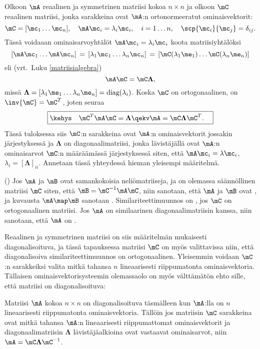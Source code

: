 Olkoon $\mA$ reaalinen ja symmetrinen matriisi kokoa $n\times n$ ja olkoon $\mC$ reaalinen
matriisi, jonka sarakkeina ovat $\mA$:n ortonormeeratut ominaisvektorit:
\[
\mC=[\mc_1\ldots\mc_n],\quad 
         \mA\mc_i=\lambda_i\mc_i, \quad i=1\ldots n, \quad \scp{\mc_i}{\mc_j}=\delta_{ij}.
\]
Tässä voidaaan ominaisarvoyhtälöt $\mA\mc_i=\lambda_i\mc_i$ koota matriisiyhtälöksi
\[
[\mA\mc_1\ldots\mA\mc_n] \,=\, [\lambda_1\mc_1\ldots\lambda_n\mc_n]
                         \,=\, [\mC(\lambda_1\me_1)\ldots\mC(\lambda_n\me_n)]
\]
eli (vrt.\ Luku \ref{matriisialgebra})
\[
\mA\mC=\mC\boldsymbol{\Lambda},
\]
missä $\boldsymbol{\Lambda}=[\lambda_1\me_1\ldots\lambda_n\me_n]=\text{diag}(\lambda_i)$. Koska
$\mC$ on ortogonaalinen, on $\inv{\mC}=\mC^T$, joten seuraa
\[
\boxed{\kehys\quad \mC^T\mA\mC=\boldsymbol{\Lambda}
                          \qekv \mA=\mC\boldsymbol{\Lambda}\mC^T. \quad}
\]
Tässä tuloksessa siis $\mC$:n sarakkeina ovat $\mA$:n  ominaisvektorit 
jossakin järjestyksessä ja $\boldsymbol{\Lambda}$ on diagonaalimatriisi, jonka lävistäjällä ovat
$\mA$:n ominaisarvot $\mC$:n määräämässä järjestyksessä siten, että $\mA\mc_i=\lambda\mc_i$,
$\lambda_i=[\boldsymbol{\Lambda}]_{ii}$. Annetaan tässä yhteydessä hieman yleisempi määritelmä.
\begin{Def} () \label{similaarimuunnos}
 
Jos $\mA$ ja $\mB$ ovat 
samankokoisia neliömatriiseja, ja on olemassa säännöllinen matriisi $\mC$ siten, että 
$\mB=\mC^{-1}\mA\mC$, niin sanotaan, että $\mA$ ja $\mB$ ovat , ja kuvausta
$\mA \map \mB$ sanotaan . Similariteettimuunnos on 
, jos $\mC$ on ortogonaalinen matriisi. Jos $\mA$ on similaarinen 
diagonaalimatriisin kanssa, niin sanotaan, että $\mA$ on .
\end{Def}
Reaalinen ja symmetrinen matriisi on siis määritelmän mukaisesti diagonalisoituva, ja tässä
tapauksessa matriisi $\mC$ on myös valittavissa niin, että diagonalisoiva similariteettimuunnos
on ortogonaalinen. Yleisemmin voidaan $\mC$:n sarakkeiksi valita mitkä tahansa $n$ lineaarisesti
riippumatonta ominaisvektoria. Tällaisen ominaisvektorisysteemin olemassaolo on myös
välttämätön ehto sille, että matriisi on diagonalisoituva:
\begin{Lause} \label{diagonalisoituva matriisi} Matriisi $\mA$ kokoa $n \times n$ on 
diagonalisoituva täsmälleen kun $\mA$:lla on $n$ lineaarisesti riippumatonta ominaisvektoria.
Tällöin jos matriisin $\mC$ sarakkeina ovat mitkä tahansa $\mA$:n lineaarisesti riippumattomat
ominaisvektorit ja diagonaalimatriisin $\boldsymbol{\Lambda}$ lävistäjäalkioina ovat vastaavat
ominaisarvot, niin $\mA=\mC\boldsymbol{\Lambda}\mC^{-1}$.
\end{Lause}
